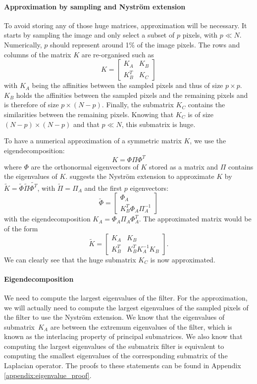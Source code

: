 \paragraph{Approximation by sampling and Nystr\"om extension}

To avoid storing any of those huge matrices, approximation will be necessary.
It starts by sampling the image and only select a subset of \(p\) pixels, with \(p \ll N\).
Numerically, \(p\) should represent around 1\% of the image pixels.
The rows and columns of the matrix \(K\) are re-organised such as
\[K = \begin{bmatrix}K_A & K_B \\ K_B^T & K_C\end{bmatrix}\]
with \(K_A\) being the affinities between the sampled pixels and thus of size \(p \times p\).
\(K_B\) holds the affinities between the sampled pixels and the remaining pixels and is therefore of size \(p \times (N-p)\).
Finally, the submatrix \(K_C\) contains the similarities between the remaining pixels.
Knowing that \(K_C\) is of size \((N-p) \times (N-p)\) and that \(p \ll N\), this submatrix is huge.

To have a numerical approximation of a symmetric matrix \(K\), we use the eigendecomposition:
\[K = \Phi \Pi \Phi^T\]
where \(\Phi\) are the orthonormal eigenvectors of \(K\) stored as a matrix and \(\Pi\) contains the eigenvalues of \(K\).
\cite{fowlkes_spectral_2004} suggests the Nystr\"om extension to approximate \(K\) by \(\tilde{K} = \tilde{\Phi} \tilde{\Pi} \tilde{\Phi^T}\), with \(\tilde{\Pi} = \Pi_A\) and the first \(p\) eigenvectors:
\[\tilde{\Phi} = \begin{bmatrix}\Phi_A \\ K_B^T \Phi_A \Pi_A^{-1}\end{bmatrix}\]
with the eigendecomposition \(K_A = \Phi_A \Pi_A \Phi_A^T\).
The approximated matrix would be of the form \cite{glide_2014}
\[\tilde{K} = \begin{bmatrix}K_A & K_B \\ K_B^T & K_B^T K_A^{-1} K_B\end{bmatrix}.\]
We can clearly see that the huge submatrix \(K_C\) is now approximated.

\paragraph{Eigendecomposition}
We need to compute the largest eigenvalues of the filter.
For the approximation, we will actually need to compute the largest eigenvalues of the sampled pixels of the filter to use the Nystr\"om extension.
We know that the eigenvalues of submatrix\ \(K_A\) are between the extremum eigenvalues of the filter, which is known as the interlacing property of principal submatrices.
We also know that computing the largest eigenvalues of the submatrix filter is equivalent to computing the smallest eigenvalues of the corresponding submatrix of the Laplacian operator.
The proofs to these statements can be found in Appendix \ref{appendix:eigenvalue_proof}.

